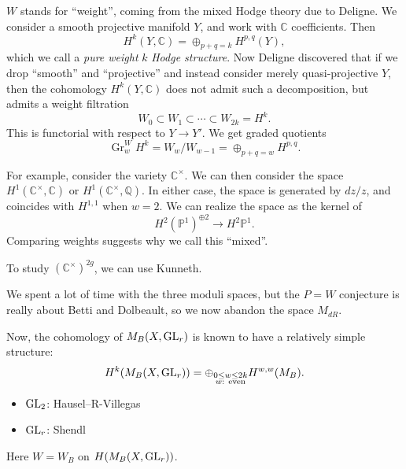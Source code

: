 \documentclass[reqno]{amsart} 
\begin{document}
$W$ stands for ``weight'', coming from the mixed Hodge theory due to Deligne.  We consider a smooth projective manifold $Y$, and work with $\mathbb{C}$ coefficients.  Then
\begin{equation*}
  H^k(Y, \mathbb{C}) = \oplus_{p + q = k}
  H^{p, q}(Y),
\end{equation*}
which we call a \emph{pure weight} $k$ \emph{Hodge structure}.  Now Deligne discovered that if we drop ``smooth'' and ``projective'' and instead consider merely quasi-projective $Y$, then the cohomology $H^k(Y, \mathbb{C})$ does not admit such a decomposition, but admits a weight filtration
\begin{equation*}
  W_0 \subset W_1 \subset \dotsb \subset W_{2 k} = H^k.
\end{equation*}
This is functorial with respect to $Y \rightarrow Y'$.  We get graded quotients
\begin{equation*}
  \operatorname{Gr}_w^W H^k
  =
  W_w / W_{w - 1}
  = \oplus_{p + q = w} H^{p, q}.
\end{equation*}

For example, consider the variety $\mathbb{C}^\times$.  We can then consider the space $H^1(\mathbb{C}^\times, \mathbb{C})$ or $H^1(\mathbb{C}^\times, \mathbb{Q})$.  In either case, the space is generated by $d z / z$, and coincides with $H^{1, 1}$ when $w = 2$.  We can realize the space as the kernel of
\begin{equation*}
  H^2(\mathbb{P}^1)^{\oplus 2} \rightarrow H^2 \mathbb{P}^1.
\end{equation*}
Comparing weights suggests why we call this ``mixed''.

To study $(\mathbb{C}^\times )^{2 g}$, we can use Kunneth.

We spent a lot of time with the three moduli spaces, but the $P = W$ conjecture is really about Betti and Dolbeault, so we now abandon the space $M_{d R}$.

Now, the cohomology of $M_{B}(X, \operatorname{GL}_r)$ is known to have a relatively simple structure:
\begin{equation*}
  H^k(M_B(X, \operatorname{GL}_r))
  = \oplus_{
    \substack{
      0 \leq w \leq 2 k  \\
      \text{$w$: even}      
    }
  }
  H^{w, w}(M_B).
\end{equation*}
\begin{itemize}
\item $\operatorname{GL}_2$: Hausel--R-Villegas
\item $\operatorname{GL}_r$: Shendl
\end{itemize}
Here $W = W_B$ on $H(M_B(X, \operatorname{GL}_r))$.
\end{document}
